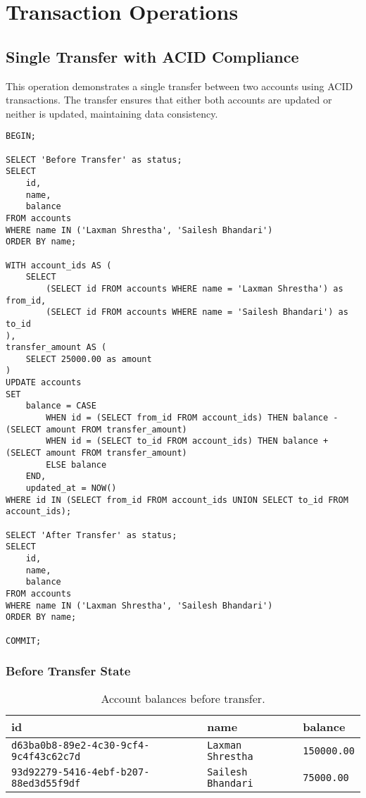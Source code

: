 \section{Transaction Operations}

\subsection{Single Transfer with ACID Compliance}
This operation demonstrates a single transfer between two accounts using ACID transactions. The transfer ensures that either both accounts are updated or neither is updated, maintaining data consistency.

\begin{verbatim}
BEGIN;

SELECT 'Before Transfer' as status;
SELECT
    id,
    name,
    balance
FROM accounts
WHERE name IN ('Laxman Shrestha', 'Sailesh Bhandari')
ORDER BY name;

WITH account_ids AS (
    SELECT
        (SELECT id FROM accounts WHERE name = 'Laxman Shrestha') as from_id,
        (SELECT id FROM accounts WHERE name = 'Sailesh Bhandari') as to_id
),
transfer_amount AS (
    SELECT 25000.00 as amount
)
UPDATE accounts
SET
    balance = CASE
        WHEN id = (SELECT from_id FROM account_ids) THEN balance - (SELECT amount FROM transfer_amount)
        WHEN id = (SELECT to_id FROM account_ids) THEN balance + (SELECT amount FROM transfer_amount)
        ELSE balance
    END,
    updated_at = NOW()
WHERE id IN (SELECT from_id FROM account_ids UNION SELECT to_id FROM account_ids);

SELECT 'After Transfer' as status;
SELECT
    id,
    name,
    balance
FROM accounts
WHERE name IN ('Laxman Shrestha', 'Sailesh Bhandari')
ORDER BY name;

COMMIT;
\end{verbatim}

\subsubsection{Before Transfer State}
\begin{table}[H]
  \centering
  \begin{tabular}{|l|l|l|}
    \hline
    \textbf{id} & \textbf{name} & \textbf{balance} \\
    \hline
    \texttt{d63ba0b8-89e2-4c30-9cf4-9c4f43c62c7d} & \texttt{Laxman Shrestha} & \texttt{150000.00} \\
    \texttt{93d92279-5416-4ebf-b207-88ed3d55f9df} & \texttt{Sailesh Bhandari} & \texttt{75000.00} \\
    \hline
  \end{tabular}
  \caption{Account balances before transfer.}
\end{table}

